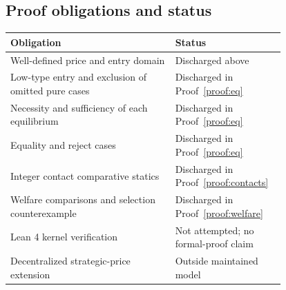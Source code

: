 \documentclass[11pt]{article}
\begin{document}
\subsection{Proof obligations and status}
\begin{center}
\begin{tabular}{p{0.54\linewidth}p{0.25\linewidth}}
\toprule
Obligation & Status\\
\midrule
Well-defined price and entry domain & Discharged above\\
Low-type entry and exclusion of omitted pure cases & Discharged in Proof~\ref{proof:eq}\\
Necessity and sufficiency of each equilibrium & Discharged in Proof~\ref{proof:eq}\\
Equality and reject cases & Discharged in Proof~\ref{proof:eq}\\
Integer contact comparative statics & Discharged in Proof~\ref{proof:contacts}\\
Welfare comparisons and selection counterexample & Discharged in Proof~\ref{proof:welfare}\\
Lean 4 kernel verification & Not attempted; no formal-proof claim\\
Decentralized strategic-price extension & Outside maintained model\\
\bottomrule
\end{tabular}
\end{center}
\end{document}
